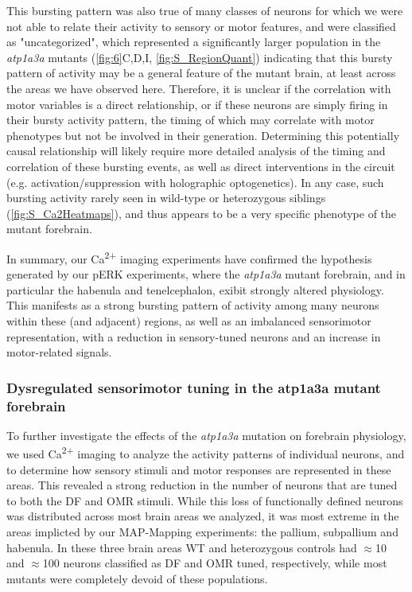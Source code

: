 This bursting pattern was also true of many classes of neurons for which we were not able to relate their activity to sensory or motor features, and were classified as "uncategorized", which represented a significantly larger population in the \emph{atp1a3a} mutants (\autoref{fig:6}C,D,I, \autoref{fig:S_RegionQuant}) indicating that this bursty pattern of activity may be a general feature of the mutant brain, at least across the areas we have observed here. Therefore, it is unclear if the correlation with motor variables is a direct relationship, or if these neurons are simply firing in their bursty activity pattern, the timing of which may correlate with motor phenotypes but not be involved in their generation. 
Determining this potentially causal relationship will likely require more detailed analysis of the timing and correlation of these bursting events, as well as direct interventions in the circuit (e.g. activation/suppression with holographic optogenetics).
In any case, such bursting activity rarely seen in wild-type or heterozygous siblings (\autoref{fig:S_Ca2Heatmaps}), and thus appears to be a very specific phenotype of the mutant forebrain.

\vspace{\baselineskip}
In summary, our Ca\textsuperscript{2+} imaging experiments have confirmed the hypothesis generated by our pERK experiments, where the \emph{atp1a3a} mutant forebrain, and in particular the habenula and tenelcephalon, exibit strongly altered physiology. This manifests as a strong bursting pattern of activity among many neurons within these (and adjacent) regions, as well as an imbalanced sensorimotor representation, with a reduction in sensory-tuned neurons and an increase in motor-related signals.


\subsubsection{Dysregulated sensorimotor tuning in the atp1a3a mutant forebrain}

To further investigate the effects of the \emph{atp1a3a} mutation on forebrain physiology, we used Ca\textsuperscript{2+} imaging to analyze the activity patterns of individual neurons, and to determine how sensory stimuli and motor responses are represented in these areas.
This revealed a strong reduction in the number of neurons that are tuned to both the DF and OMR stimuli. 
While this loss of functionally defined neurons was distributed across most brain areas we analyzed, it was most extreme in the areas implicted by our MAP-Mapping experiments: the pallium, subpallium and habenula. 
In these three brain areas WT and heterozygous controls had $\approx$10 and $\approx$100 neurons classified as DF and OMR tuned, respectively, while most mutants were completely devoid of these populations. 

